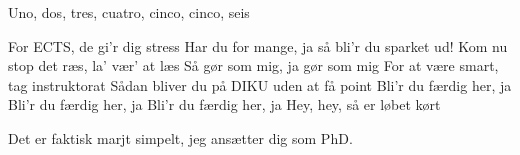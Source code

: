 \documentclass[a4paper,11pt]{article}
\begin{document}
\begin{song}
Uno, dos, tres, cuatro, cinco, cinco, seis


For ECTS, de gi'r dig stress
Har du for mange, ja så bli'r du sparket ud!
Kom nu stop det ræs, la' vær' at læs
Så gør som mig, ja gør som mig
For at være smart, tag instruktorat
Sådan bliver du på DIKU uden at få point
Bli'r du færdig her, ja
Bli'r du færdig her, ja
Bli'r du færdig her, ja
Hey, hey, så er løbet kørt




 Det er faktisk marjt simpelt, jeg ansætter dig som PhD.


\end{song}
\end{document}
